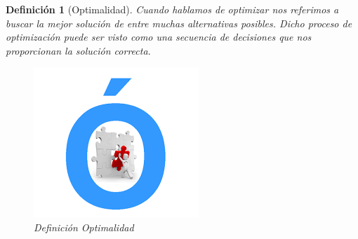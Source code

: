 \documentclass[12pt,twoside]{article}
\newtheorem{defi}{Definición}
\begin{document}
\begin{defi}[Optimalidad]
Cuando hablamos de optimizar nos referimos a buscar la mejor solución de entre muchas alternativas posibles. Dicho proceso de optimización puede ser visto como una secuencia de decisiones que nos proporcionan la solución correcta.
\\
\begin{figure}[h!]
\centering
\includegraphics[scale=.2]{opt.png}
\caption{Definición Optimalidad}
\label{fig:universe}
\end{figure}
\end{defi}
\newpage
\end{document}
